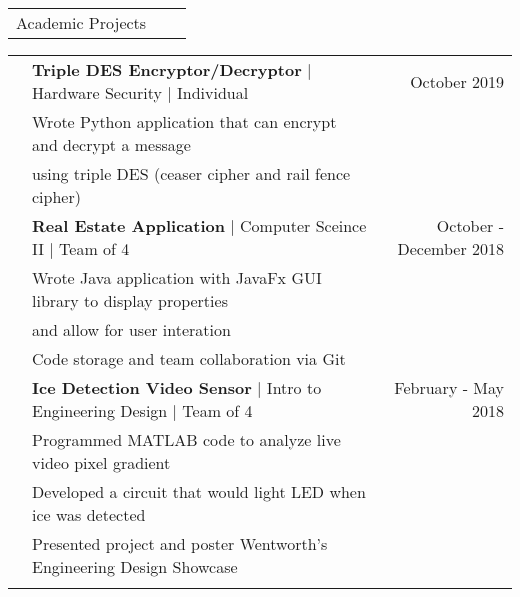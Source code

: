 \documentclass[letterpaper,10pt,oneside]{article}
\begin{document}
 \noindent \begin{tabularx}{\linewidth}{@{} l l R } 
     \Large{Academic Projects}\\
 \end{tabularx}
 \noindent \begin{tabularx}{\linewidth}{@{} l l R } 
     & \textbf{Triple DES Encryptor/Decryptor} $\mid$ Hardware Security $\mid$ Individual & October 2019 \\
     &Wrote Python application that can encrypt and decrypt a message\\
     &\indent using triple DES (ceaser cipher and rail fence cipher)\\
     & \textbf{Real Estate Application} $\mid$ Computer Sceince II $\mid$ Team of 4 & October - December 2018 \\
     &Wrote Java application with JavaFx GUI library to display properties\\
     &\indent and allow for user interation\\
     &Code storage and team collaboration via Git\\
     & \textbf{Ice Detection Video Sensor} $\mid$ Intro to Engineering Design $\mid$ Team of 4 & February - May 2018 \\
     &Programmed MATLAB code to analyze live video pixel gradient\\
     &Developed a circuit that would light LED when ice was detected\\
     &Presented project and poster Wentworth's Engineering Design Showcase\\
     \\
\end{tabularx}
\end{document}
